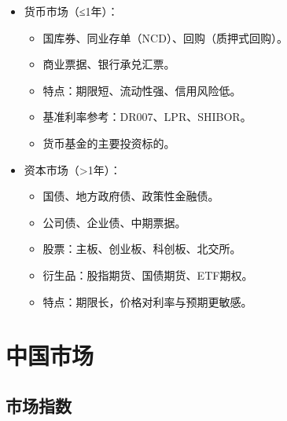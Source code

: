 \documentclass[11pt]{ctexart}
\theoremstyle{definition}
\begin{document}
\begin{itemize}
    \item 货币市场（≤1年）：
    \begin{itemize}
        \item 国库券、同业存单（NCD）、回购（质押式回购）。
        \item 商业票据、银行承兑汇票。
        \item 特点：期限短、流动性强、信用风险低。
        \item 基准利率参考：DR007、LPR、SHIBOR。
        \item 货币基金的主要投资标的。
    \end{itemize}

    \item 资本市场（>1年）：
    \begin{itemize}
        \item 国债、地方政府债、政策性金融债。
        \item 公司债、企业债、中期票据。
        \item 股票：主板、创业板、科创板、北交所。
        \item 衍生品：股指期货、国债期货、ETF期权。
        \item 特点：期限长，价格对利率与预期更敏感。
    \end{itemize}
\end{itemize}

\section*{中国市场}

\subsection*{市场指数}
\end{document}
